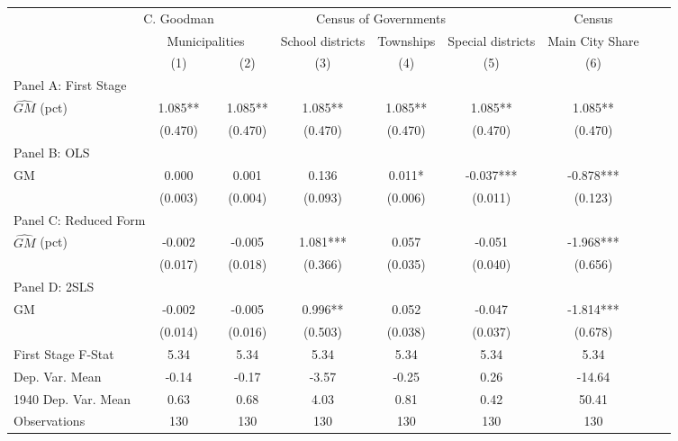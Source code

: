  \begin{tabular}{l*{8}{c}} \toprule
&\multicolumn{1}{c}{C. Goodman}&\multicolumn{4}{c}{Census of Governments}&\multicolumn{1}{c}{Census}\\\cmidrule(lr){2-2}\cmidrule(lr){3-6}\cmidrule(lr){7-7}
&\multicolumn{2}{c}{Municipalities}&\multicolumn{1}{c}{School districts}&\multicolumn{1}{c}{Townships}&\multicolumn{1}{c}{Special districts}&\multicolumn{1}{c}{Main City Share}\\\cmidrule(lr){2-3}\cmidrule(lr){4-6}\cmidrule(lr){7-7}
&\multicolumn{1}{c}{(1)}&\multicolumn{1}{c}{(2)}&\multicolumn{1}{c}{(3)}&\multicolumn{1}{c}{(4)}&\multicolumn{1}{c}{(5)}&\multicolumn{1}{c}{(6)}\\
\cmidrule(lr){1-7}
\multicolumn{6}{l}{Panel A: First Stage}\\
\cmidrule(lr){1-7}
$\widehat{GM}$ (pct)&    1.085** &    1.085** &    1.085** &    1.085** &    1.085** &    1.085** \\
                &  (0.470)   &  (0.470)   &  (0.470)   &  (0.470)   &  (0.470)   &  (0.470)   \\
\cmidrule(lr){1-7}
\multicolumn{6}{l}{Panel B: OLS}\\
\cmidrule(lr){1-7}
GM              &    0.000   &    0.001   &    0.136   &    0.011*  &   -0.037***&   -0.878***\\
                &  (0.003)   &  (0.004)   &  (0.093)   &  (0.006)   &  (0.011)   &  (0.123)   \\
\cmidrule(lr){1-7}
\multicolumn{6}{l}{Panel C: Reduced Form}\\
\cmidrule(lr){1-7}
$\widehat{GM}$ (pct)&   -0.002   &   -0.005   &    1.081***&    0.057   &   -0.051   &   -1.968***\\
                &  (0.017)   &  (0.018)   &  (0.366)   &  (0.035)   &  (0.040)   &  (0.656)   \\
\cmidrule(lr){1-7}
\multicolumn{6}{l}{Panel D: 2SLS}\\
\cmidrule(lr){1-7}
GM              &   -0.002   &   -0.005   &    0.996** &    0.052   &   -0.047   &   -1.814***\\
                &  (0.014)   &  (0.016)   &  (0.503)   &  (0.038)   &  (0.037)   &  (0.678)   \\
\midrule
First Stage F-Stat&     5.34   &     5.34   &     5.34   &     5.34   &     5.34   &     5.34   \\
Dep. Var. Mean  &    -0.14   &    -0.17   &    -3.57   &    -0.25   &     0.26   &   -14.64   \\
1940 Dep. Var. Mean&     0.63   &     0.68   &     4.03   &     0.81   &     0.42   &    50.41   \\
Observations    &      130   &      130   &      130   &      130   &      130   &      130   \\
 \bottomrule \end{tabular}
